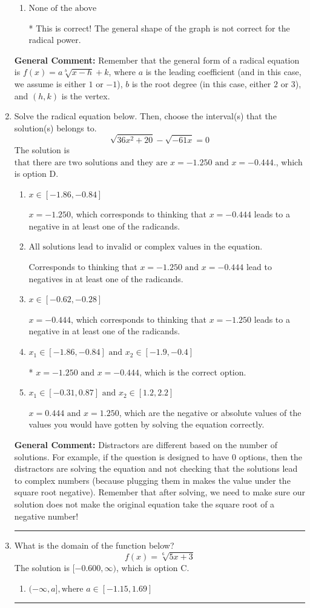 \documentclass{extbook}[14pt]
\newcommand{\litem}[1]{\item #1

\rule{\textwidth}{0.4pt}}
\begin{document}
\begin{enumerate}
{\begin{enumerate}[label=\Alph*.]
This corresponds to switching the coefficient and having the correct vertex with the root degree as $2$.
\item \( \text{None of the above} \)

* This is correct! The general shape of the graph is not correct for the radical power.
\end{enumerate}

\textbf{General Comment:} Remember that the general form of a radical equation is $ f(x) = a \sqrt[b]{x - h} + k$, where $a$ is the leading coefficient (and in this case, we assume is either $1$ or $-1$), $b$ is the root degree (in this case, either $2$ or $3$), and $(h, k)$ is the vertex.
}
\litem{
Solve the radical equation below. Then, choose the interval(s) that the solution(s) belongs to.
\[ \sqrt{36 x^2 + 20} - \sqrt{-61 x} = 0 \]The solution is \( \text{that there are two solutions and they are } x = -1.250 \text{ and } x = -0.444. \), which is option D.\begin{enumerate}[label=\Alph*.]
\item \( x \in [-1.86,-0.84] \)

$x = -1.250$, which corresponds to thinking that $x = -0.444$ leads to a negative in at least one of the radicands.
\item \( \text{All solutions lead to invalid or complex values in the equation.} \)

Corresponds to thinking that $x = -1.250 \text{ and } x = -0.444$ lead to negatives in at least one of the radicands.
\item \( x \in [-0.62,-0.28] \)

$x = -0.444$, which corresponds to thinking that $x = -1.250$ leads to a negative in at least one of the radicands.
\item \( x_1 \in [-1.86, -0.84] \text{ and } x_2 \in [-1.9,-0.4] \)

* $x = -1.250 \text{ and } x = -0.444$, which is the correct option.
\item \( x_1 \in [-0.31, 0.87] \text{ and } x_2 \in [1.2,2.2] \)

$x = 0.444 \text{ and } x = 1.250$, which are the negative or absolute values of the values you would have gotten by solving the equation correctly.
\end{enumerate}

\textbf{General Comment:} Distractors are different based on the number of solutions. For example, if the question is designed to have 0 options, then the distractors are solving the equation and not checking that the solutions lead to complex numbers (because plugging them in makes the value under the square root negative). Remember that after solving, we need to make sure our solution does not make the original equation take the square root of a negative number!
}
\litem{
What is the domain of the function below?
\[ f(x) = \sqrt[6]{5 x + 3} \]The solution is \( [-0.600, \infty) \), which is option C.\begin{enumerate}[label=\Alph*.]
\item \( (-\infty, a], \text{where } a \in [-1.15, 1.69] \)


\end{enumerate}}
\end{enumerate}
\end{document}
